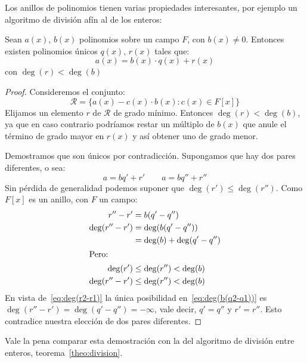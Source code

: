   Los anillos de polinomios tienen varias propiedades interesantes,
  por ejemplo un algoritmo de división afín al de los enteros:%
  \begin{theorem}
    \label{theo:F[x]:division-algorithm}
    Sean \(a(x)\), \(b(x)\) polinomios sobre un campo \(F\),
    con \(b(x) \ne 0\).
    Entonces existen polinomios únicos \(q(x)\), \(r(x)\)
    tales que:
    \begin{equation*}
      a(x) = b(x) \cdot q(x) + r(x)
    \end{equation*}
    con \(\deg(r) < \deg(b)\)
  \end{theorem}
  \begin{proof}
    Consideremos el conjunto:
    \begin{equation*}
      \mathcal{R}
	= \{a(x) - c(x) \cdot b(x) \colon c(x) \in F[x]\}
    \end{equation*}
    Elijamos un elemento \(r\) de \(\mathcal{R}\) de grado mínimo.
    Entonces \(\deg(r) < \deg(b)\),
    ya que en caso contrario
    podríamos restar un múltiplo de \(b(x)\)
    que anule el término de grado mayor en \(r(x)\)
    y así obtener uno de grado menor.

    Demostramos que son únicos por contradicción.%
    Supongamos que hay dos pares diferentes,
    o sea:
    \begin{equation*}
      a = b q' + r' \qquad
      a = b q'' + r''
    \end{equation*}
    Sin pérdida de generalidad
    podemos suponer que \(\deg(r') \le \deg(r'')\).
    Como \(F[x]\) es un anillo,
    con \(F\) un campo:
    \begin{align}
      r'' - r'
	&= b (q' - q'') \notag \\
      \deg(r'' - r')
	&= \deg(b (q' - q'')) \notag \\
	&= \deg(b) + \deg(q' - q'') \label{eq:deg(b(q2-q1))} \\
    \intertext{Pero:}
      \deg(r')
	&\le \deg(r'') < \deg(b) \notag \\
      \deg(r'' - r')
	&\le \deg(r'') < \deg(b) \label{eq:deg(r2-r1)}
    \end{align}
    En vista de~\eqref{eq:deg(r2-r1)}
    la única posibilidad en~\eqref{eq:deg(b(q2-q1))}
    es \(\deg(r'' - r') = \deg(q' - q'') = -\infty\),
    vale decir,
    \(q' = q''\) y \(r' = r''\).
    Esto contradice nuestra elección de dos pares diferentes.
  \end{proof}
  Vale la pena comparar esta demostración
  con la del algoritmo de división entre enteros,
  teorema~\ref{theo:division}.

